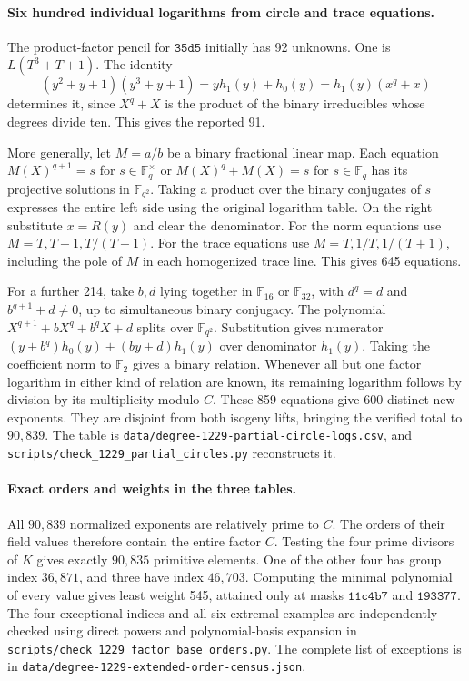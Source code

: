 \documentclass[11pt]{article}
\newcommand{\F}{\mathbb F_2}
\begin{document}
\paragraph{Six hundred individual logarithms from circle and trace equations.}
The product-factor pencil for \(\mathtt{35d5}\) initially has 92
unknowns. One is \(L(T^3+T+1)\). The identity
\[
 (y^2+y+1)(y^3+y+1)=y h_1(y)+h_0(y)=h_1(y)(x^q+x)
\]
determines it, since \(X^q+X\) is the product of the binary
irreducibles whose degrees divide ten. This gives the reported 91.

More generally, let \(M=a/b\) be a binary fractional linear map.
Each equation \(M(X)^{q+1}=s\) for \(s\in\mathbb F_q^\times\) or
\(M(X)^q+M(X)=s\) for \(s\in\mathbb F_q\) has its projective
solutions in \(\mathbb F_{q^2}\). Taking a product over the binary
conjugates of \(s\) expresses the entire left side using the original
logarithm table. On the right substitute \(x=R(y)\) and clear the
denominator. For the norm equations use \(M=T,T+1,T/(T+1)\).
For the trace equations use \(M=T,1/T,1/(T+1)\), including the
pole of \(M\) in each homogenized trace line. This gives 645 equations.

For a further 214, take \(b,d\) lying together in \(\mathbb F_{16}\)
or \(\mathbb F_{32}\), with \(d^q=d\) and \(b^{q+1}+d\ne0\), up to
simultaneous binary conjugacy. The polynomial
\(X^{q+1}+bX^q+b^qX+d\) splits over \(\mathbb F_{q^2}\).
Substitution gives numerator
\((y+b^q)h_0(y)+(by+d)h_1(y)\) over denominator \(h_1(y)\).
Taking the coefficient norm to \(\F\) gives a binary relation.
Whenever all but one factor logarithm in either kind of relation are
known, its remaining logarithm follows by division by its multiplicity
modulo \(C\). These 859 equations give 600 distinct new exponents.
They are disjoint from both isogeny lifts, bringing the verified total
to \(90{,}839\). The table is
\nolinkurl{data/degree-1229-partial-circle-logs.csv}, and
\nolinkurl{scripts/check_1229_partial_circles.py} reconstructs it.

\paragraph{Exact orders and weights in the three tables.}
All \(90{,}839\) normalized exponents are relatively prime to \(C\).
The orders of their field values therefore contain the entire factor
\(C\). Testing the four prime divisors of \(K\) gives exactly
\(90{,}835\) primitive elements. One of the other four has group
index \(36{,}871\), and three have index \(46{,}703\). Computing the
minimal polynomial of every value gives least weight 545, attained
only at masks \(\mathtt{11c4b7}\) and \(\mathtt{193377}\).
The four exceptional indices and all six extremal examples are
independently checked using direct powers and polynomial-basis
expansion in \nolinkurl{scripts/check_1229_factor_base_orders.py}.
The complete list of exceptions is in
\nolinkurl{data/degree-1229-extended-order-census.json}.
\end{document}
